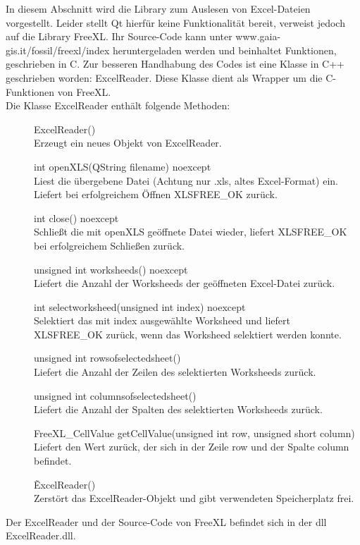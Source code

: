 In diesem Abschnitt wird die Library zum Auslesen von Excel-Dateien vorgestellt. Leider stellt Qt hierfür keine Funktionalität bereit, verweist jedoch auf die Library FreeXL. Ihr Source-Code kann unter www.gaia-gis.it/fossil/freexl/index heruntergeladen werden und beinhaltet Funktionen, geschrieben in C. Zur besseren Handhabung des Codes ist eine Klasse in C++ geschrieben worden: ExcelReader. Diese Klasse dient als Wrapper um die C-Funktionen von FreeXL.\bigskip \\
Die Klasse ExcelReader enthält folgende Methoden:
\begin{description}
	\item[ ] ExcelReader()\\
	Erzeugt ein neues Objekt von ExcelReader.
  \item[ ] int openXLS(QString filename) noexcept\\
	Liest die übergebene Datei (Achtung nur .xls, altes Excel-Format) ein. Liefert bei erfolgreichem Öffnen XLSFREE\_OK zurück.
  \item[ ]  int close() noexcept\\
	Schließt die mit openXLS geöffnete Datei wieder, liefert XLSFREE\_OK bei erfolgreichem Schließen zurück.
  \item[ ]  unsigned int worksheeds() noexcept\\
	Liefert die Anzahl der Worksheeds der geöffneten Excel-Datei zurück.
  \item[ ]  int selectworksheed(unsigned int index) noexcept\\
	Selektiert das mit index ausgewählte Worksheed und liefert XLSFREE\_OK zurück, wenn das Worksheed selektiert werden konnte.
  \item[ ]  unsigned int rowsofselectedsheet()\\
	Liefert die Anzahl der Zeilen des selektierten Worksheeds zurück.
  \item[ ]  unsigned int columnsofselectedsheet()\\
	Liefert die Anzahl der Spalten des selektierten Worksheeds zurück.
  \item[ ]  FreeXL\_CellValue getCellValue(unsigned int row, unsigned short column)\\
	Liefert den Wert zurück, der sich in der Zeile row und der Spalte column befindet.
  \item[ ]  \~ExcelReader()\\
	Zerstört das ExcelReader-Objekt und gibt verwendeten Speicherplatz frei.
\end{description}
Der ExcelReader und der Source-Code von FreeXL befindet sich in der dll ExcelReader.dll.